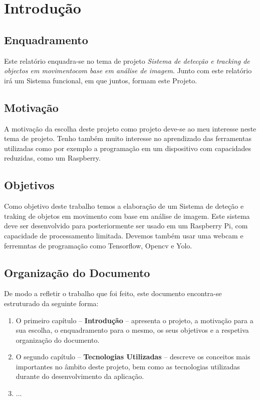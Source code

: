 \chapter{Introdução}
\label{chap:intro}


\section{Enquadramento}
\label{sec:amb}

Este relatório enquadra-se no tema de projeto \textit{Sistema de detecção e tracking de objectos em movimentocom base em análise de imagem}. Junto com este relatório irá um Sistema funcional, em que juntos, formam este Projeto.


\section{Motivação}
\label{sec:mot}

A motivação da escolha deste projeto como projeto deve-se ao meu interesse neste tema de projeto. Tenho também muito interesse no aprendizado das ferramentas utilizadas como por exemplo a programação em um dispositivo com capacidades reduzidas, como um \ac{Raspberry}.


\section{Objetivos}
\label{sec:obj}

Como objetivo deste trabalho temos a elaboração de um Sistema de deteção e traking de objetos em movimento com base em análise de imagem. Este sistema deve ser desenvolvido para posteriormente ser usado em um Raspberry Pi, com capacidade de processamento limitada. Devemos também usar uma webcam e ferremntas de programação como Tensorflow, Opencv e Yolo.

\section{Organização do Documento}
\label{sec:organ}
De modo a refletir o trabalho que foi feito, este documento encontra-se estruturado da seguinte forma:
\begin{enumerate}
\item O primeiro capítulo -- \textbf{Introdução} -- apresenta o projeto, a motivação para a sua escolha, o enquadramento para o mesmo, os seus objetivos e a respetiva organização do documento.
\item O segundo capítulo -- \textbf{Tecnologias Utilizadas} -- descreve os conceitos mais importantes no âmbito deste projeto, bem como as tecnologias utilizadas durante do desenvolvimento da aplicação.
\item ...
\end{enumerate}

